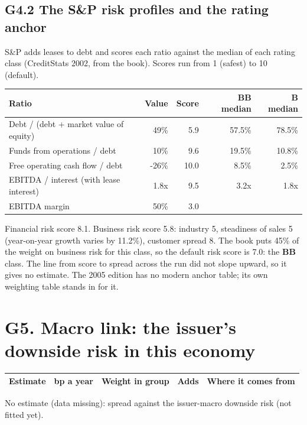 \documentclass[11pt,a4paper]{article}
\begin{document}
\subsection*{G4.2 The S\&P risk profiles and the rating anchor}
S\&P adds leases to debt and scores each ratio against the median of each rating class (CreditStats 2002, from the book). Scores run from 1 (safest) to 10 (default).
\begin{center}\footnotesize\setlength{\tabcolsep}{3.5pt}\begin{tabular}{@{}lrrrr@{}}\toprule
Ratio & Value & Score & BB median & B median \\\midrule
Debt / (debt + market value of equity) & 49\% & 5.9 & 57.5\% & 78.5\% \\
Funds from operations / debt & 10\% & 9.6 & 19.5\% & 10.8\% \\
Free operating cash flow / debt & -26\% & 10.0 & 8.5\% & 2.5\% \\
EBITDA / interest (with lease interest) & 1.8x & 9.5 & 3.2x & 1.8x \\
EBITDA margin & 50\% & 3.0 &  &  \\
\bottomrule\end{tabular}\end{center}
Financial risk score 8.1. Business risk score 5.8: industry 5, steadiness of sales 5 (year-on-year growth varies by 11.2\%), customer spread 8. The book puts 45\% of the weight on business risk for this class, so the default risk score is 7.0: the \textbf{BB} class. The line from score to spread across the run did not slope upward, so it gives no estimate. The 2005 edition has no modern anchor table; its own weighting table stands in for it.
\section*{G5. Macro link: the issuer's downside risk in this economy}
\par\noindent{}
\begin{center}\footnotesize\setlength{\tabcolsep}{3.5pt}\begin{tabular}{@{}p{6.2cm}rrrp{4.2cm}@{}}\toprule
Estimate & bp a year & Weight in group & Adds & Where it comes from \\\midrule
\bottomrule\end{tabular}\end{center}
No estimate (data missing): spread against the issuer-macro downside risk (not fitted yet).
\end{document}
